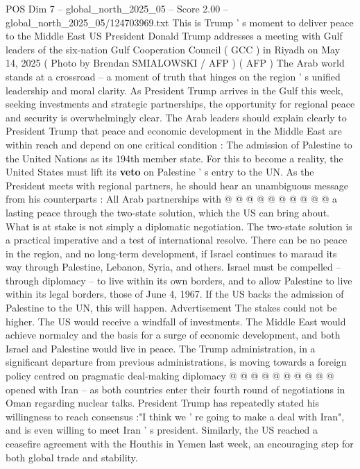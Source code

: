 \begin{textsample}{POS Dim 7 – global\_north\_2025\_05 – Score 2.00 – global\_north\_2025\_05/124703969.txt}  \label{ex:f7_pos_341}
This is Trump ' s moment to deliver peace to the Middle East US President Donald Trump addresses a meeting with Gulf leaders of the six-nation Gulf Cooperation Council ( GCC ) in Riyadh on May 14, 2025 ( Photo by Brendan SMIALOWSKI / AFP ) ( AFP ) The Arab world stands at a crossroad -- a moment of truth that hinges on the region ' s unified leadership and moral clarity.
As President Trump arrives in the Gulf this week, seeking investments and strategic partnerships, the opportunity for regional peace and security is overwhelmingly clear.
The Arab leaders should explain clearly to President Trump that peace and economic development in the Middle East are within reach and depend on one critical condition : The admission of Palestine to the United Nations as its 194th member state.
For this to become a reality, the United States must lift its \textbf{veto} on Palestine ' s entry to the UN.
As the President meets with regional partners, he should hear an unambiguous message from his counterparts : All Arab partnerships with @ @ @ @ @ @ @ @ @ @ a lasting peace through the two-state solution, which the US can bring about.
What is at stake is not simply a diplomatic negotiation.
The two-state solution is a practical imperative and a test of international resolve.
There can be no peace in the region, and no long-term development, if Israel continues to maraud its way through Palestine, Lebanon, Syria, and others.
Israel must be compelled -- through diplomacy -- to live within its own borders, and to allow Palestine to live within its legal borders, those of June 4, 1967.
If the US backs the admission of Palestine to the UN, this will happen.
Advertisement The stakes could not be higher.
The US would receive a windfall of investments.
The Middle East would achieve normalcy and the basis for a surge of economic development, and both Israel and Palestine would live in peace.
The Trump administration, in a significant departure from previous administrations, is moving towards a foreign policy centred on pragmatic deal-making diplomacy @ @ @ @ @ @ @ @ @ @ opened with Iran -- as both countries enter their fourth round of negotiations in Oman regarding nuclear talks.
President Trump has repeatedly stated his willingness to reach consensus :"I think we ' re going to make a deal with Iran", and is even willing to meet Iran ' s president.
Similarly, the US reached a ceasefire agreement with the Houthis in Yemen last week, an encouraging step for both global trade and stability.

\end{textsample}
